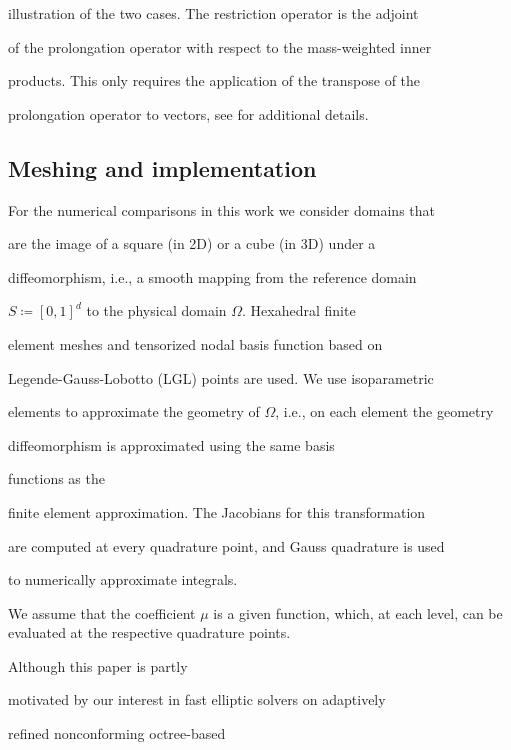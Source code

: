 \documentclass[smallcondensed,final]{svjour3}     %
\begin{document}
illustration of the two cases. The restriction operator is the adjoint

of the prolongation operator with respect to the mass-weighted inner

products. This only requires the application of the transpose of the

prolongation operator to vectors, see \cite{SampathBiros10} for additional details.






\subsection{Meshing and implementation} %

\label{sub:meshing}



For the numerical comparisons in this work we consider domains that

are the image of a square (in 2D) or a cube (in 3D) under a

diffeomorphism, i.e., a smooth mapping from the reference domain

$S\coloneqq[0,1]^d$ to the physical domain $\Omega$. Hexahedral finite

element meshes and tensorized nodal basis function based on

Legende-Gauss-Lobotto (LGL) points are used.  We use isoparametric

elements to approximate the geometry of $\Omega$, i.e., on each element the geometry

diffeomorphism is approximated using the same basis

functions as the

finite element approximation. The Jacobians for this transformation

are computed at every quadrature point, and Gauss quadrature is used

to numerically approximate integrals.

We assume that the coefficient $\mu$ is a given function, which, at each level, can be evaluated at the respective quadrature points.

Although this paper is partly

motivated by our interest in fast elliptic solvers on adaptively

refined nonconforming octree-based
\end{document}
